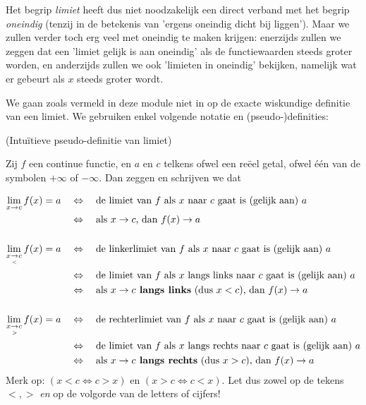 \documentclass[numbers]{ximera}
\begin{document}
 Het begrip \textit{limiet} heeft dus niet noodzakelijk een direct verband met het begrip \textit{oneindig} (tenzij in de betekenis van 'ergens oneindig dicht bij liggen'). Maar we zullen verder toch erg veel met oneindig te maken krijgen: enerzijds zullen we zeggen dat een 'limiet gelijk is aan oneindig' als de functiewaarden steeds groter worden, en anderzijds zullen we ook 'limieten in oneindig' bekijken, namelijk wat er gebeurt als $x$ steeds groter wordt.


We gaan zoals vermeld in deze module niet in op de exacte wiskundige definitie van een limiet. We gebruiken enkel volgende notatie en (pseudo-)definities:

\begin{definition} (Intuïtieve pseudo-definitie van limiet)
	
	Zij $f$ een continue functie, en $a$ en $c$ telkens ofwel een reëel getal, ofwel één van de symbolen $+\infty$ of $-\infty$. 
	Dan zeggen en schrijven we dat 

\begin{align*}
	\limxc  f(x) = a & \quad\iff\quad \text{de limiet van $f$ als $x$ naar $c$ gaat is (gelijk aan) $a$} \\
	                   & \quad\iff\quad \text{als }x\to c\text{, dan } 									f(x) \to a \\
	                   \\
	\llimxc f(x) = a & \quad\iff\quad \text{de linkerlimiet van $f$ als $x$ naar $c$ gaat is (gelijk aan) $a$} \\
	                   & \quad\iff\quad \text{de limiet van $f$ als $x$ langs links naar $c$ gaat is (gelijk aan) $a$} \\
	                   & \quad\iff\quad \text{als }x\to c\text{\textbf{ langs links} (dus $x<c$), dan } f(x) \to a \\
	                   \\
	\rlimxc f(x) = a & \quad\iff\quad \text{de rechterlimiet van $f$ als $x$ naar $c$ gaat is (gelijk aan) $a$} \\
					   & \quad\iff\quad \text{de limiet van $f$ als $x$ langs rechts naar $c$ gaat is (gelijk aan) $a$} \\
					   & \quad\iff\quad \text{als }x\to c\text{\textbf{ langs rechts} (dus $x>c$), dan }f(x) \to a 
\end{align*}
Merk op: $(x<c\iff c>x)$ en $(x>c \iff c<x)$. Let dus zowel op de tekens $<,>$ \textit{en} op de volgorde van de letters of cijfers!  
\end{definition}
\end{document}
